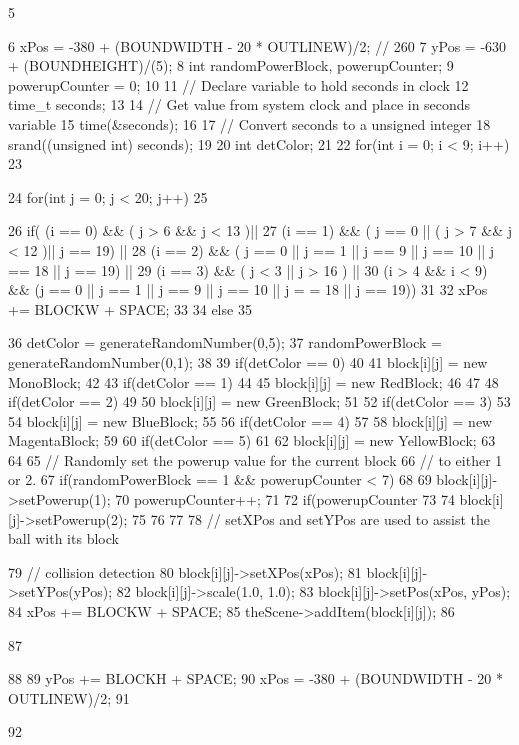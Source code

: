 \begin{DoxyCode}
5 {
6     xPos = -380 + (BOUNDWIDTH - 20 * OUTLINEW)/2;       // 260
7     yPos = -630 + (BOUNDHEIGHT)/(5);
8     int randomPowerBlock, powerupCounter;
9     powerupCounter = 0;
10 
11     // Declare variable to hold seconds in clock
12     time_t seconds;
13 
14     // Get value from system clock and place in seconds variable
15     time(&seconds);
16 
17     // Convert seconds to a unsigned integer
18     srand((unsigned int) seconds);
19 
20     int detColor;
21 
22     for(int i = 0; i < 9; i++)
23     {
24         for(int j = 0; j < 20; j++)
25         {
26             if( (i == 0) && ( j > 6 && j < 13 )||
27                 (i == 1) && ( j == 0 || ( j > 7 && j < 12 )|| j == 19) ||
28                 (i == 2) && ( j == 0 || j == 1 || j == 9 || j == 10 || j == 18 ||
       j == 19) ||
29                 (i == 3) && ( j < 3 || j > 16 ) ||
30                 (i > 4 && i < 9) && (j == 0 || j == 1 || j == 9 || j == 10 || j =
      = 18 || j == 19))
31             {
32                  xPos += BLOCKW + SPACE;
33             }
34             else
35             {
36                 detColor = generateRandomNumber(0,5);
37                 randomPowerBlock = generateRandomNumber(0,1);
38 
39                 if(detColor == 0)
40                 {
41                     block[i][j] = new MonoBlock;
42                 }
43                 if(detColor == 1)
44                 {
45                     block[i][j] = new RedBlock;
46                 }
47 
48                 if(detColor == 2)
49                 {
50                     block[i][j] = new GreenBlock;
51                 }
52                 if(detColor == 3)
53                 {
54                     block[i][j] = new BlueBlock;
55                 }
56                 if(detColor == 4)
57                 {
58                     block[i][j] = new MagentaBlock;
59                 }
60                 if(detColor == 5)
61                 {
62                     block[i][j] = new YellowBlock;
63                 }
64 
65                 // Randomly set the powerup value for the current block
66                 // to either 1 or 2.
67                 if(randomPowerBlock == 1 && powerupCounter < 7)
68                 {
69                     block[i][j]->setPowerup(1);
70                     powerupCounter++;
71 
72                     if(powerupCounter %
73                     {
74                         block[i][j]->setPowerup(2);
75                     }
76                 }
77 
78                 // setXPos and setYPos are used to assist the ball with its block
      
79                 // collision detection
80                 block[i][j]->setXPos(xPos);
81                 block[i][j]->setYPos(yPos);
82                 block[i][j]->scale(1.0, 1.0);
83                 block[i][j]->setPos(xPos, yPos);
84                 xPos += BLOCKW + SPACE;
85                 theScene->addItem(block[i][j]);  
86             }
87         }
88 
89         yPos += BLOCKH + SPACE;
90         xPos = -380 + (BOUNDWIDTH - 20 * OUTLINEW)/2;
91     }
92 }
\end{DoxyCode}


